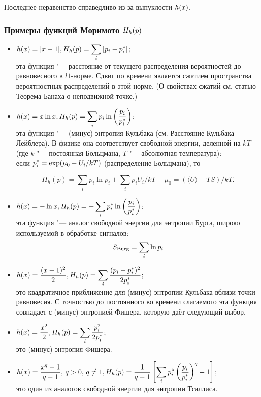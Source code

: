\documentclass{article}
\begin{document}
Последнее неравенство справедливо из-за выпуклости ${\displaystyle h(x)}$.

\subsubsection{Примеры функций Моримото ${\displaystyle H_{h}(p)}$}
\begin{itemize}
	\item ${\displaystyle h(x)=|x-1|, H_{h}(p)=\sum _{i}|p_{i}-p_{i}^{*}|}$;\\
	эта функция "--- расстояние от текущего распределения вероятностей до равновесного в $l1$-норме. Сдвиг по времени является сжатием пространства вероятностных распределений в этой норме. (О свойствах сжатий см. статью Теорема Банаха о неподвижной точке.)
	\item ${\displaystyle h(x)=x\ln x, H_{h}(p)=\sum _{i}p_{i}\ln \left({\frac {p_{i}}{p_{i}^{*}}}\right)}$;\\
	эта функция "--- (минус) энтропия Кульбака (см. Расстояние Кульбака — Лейблера). В физике она соответствует свободной энергии, деленной на $kT$ (где $k$ "--- постоянная Больцмана, $T$ "--- абсолютная температура):\\
	если ${\displaystyle p_{i}^{*}=\exp(\mu _{0}-U_{i}/kT)}$ (распределение Больцмана), то
	
	\begin{equation*}
		H_{h}(p)=\sum _{i}p_{i}\ln p_{i}+\sum _{i}p_{i}U_{i}/kT-\mu _{0}=(\langle U\rangle -TS)/kT.
	\end{equation*}
	\item ${\displaystyle h(x)=-\ln x, H_{h}(p)=-\sum _{i}p_{i}^{*}\ln \left({\frac {p_{i}}{p_{i}^{*}}}\right)}$;\\
	эта функция "--- аналог свободной энергии для энтропии Бурга, широко используемой в обработке сигналов:\\
	
	\begin{equation*}
		S_{{{\rm {Burg}}}}=\sum _{i}\ln p_{i}
	\end{equation*}
	\item ${\displaystyle h(x)={\frac  {(x-1)^{2}}{2}}, H_{h}(p)=\sum _{i}{\frac {(p_{i}-p_{i}^{*})^{2}}{2p_{i}^{*}}}}$;\\
	это квадратичное приближение для (минус) энтропии Кульбака вблизи точки равновесия. С точностью до постоянного во времени слагаемого эта функция совпадает с (минус) энтропией Фишера, которую даёт следующий выбор,
	\item ${\displaystyle h(x)={\frac  {x^{2}}{2}}, H_{h}(p)=\sum _{i}{\frac {p_{i}^{2}}{2p_{i}^{*}}}}$;\\
	это (минус) энтропия Фишера.
	\item ${\displaystyle h(x)={\frac  {x^{q}-1}{q-1}},\,q>0,\,q\neq 1, H_{h}(p)={\frac {1}{q-1}}\left[\sum _{i}p_{i}^{*}\left({\frac {p_{i}}{p_{i}^{*}}}\right)^{q}-1\right]}$;\\
	это один из аналогов свободной энергии для энтропии Тсаллиса.\\
	

\end{itemize}
\end{document}
